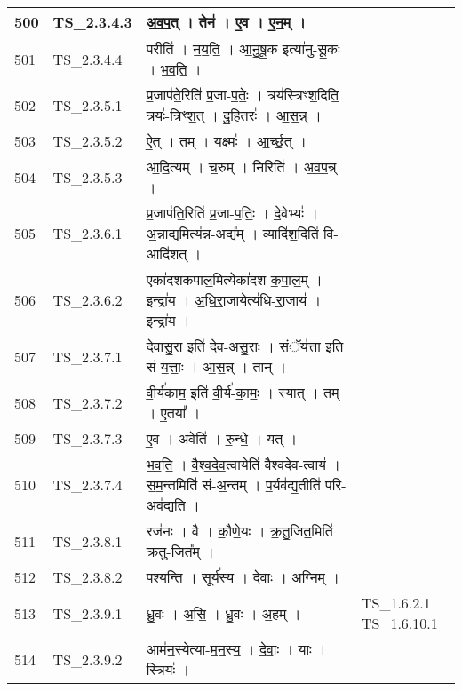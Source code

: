 \documentclass[17pt]{extarticle}
\begin{document}
\begin{longtable}{||p{0.4in}||p{0.9in}||p{4.0in}||p{0.9in}||}
        \hline
            500 & TS\_2.3.4.3 & अ॒व॒प॒त्   ।   तेन॑   ।   ए॒व   ।   ए॒न॒म्   ।    &      \\
        \hline
            501 & TS\_2.3.4.4 & परीति॑   ।   न॒य॒ति॒   ।   आ॒नु॒षू॒क इत्या॑नु{-}सू॒कः   ।   भ॒व॒ति॒   ।    &      \\
        \hline
            502 & TS\_2.3.5.1 & प्र॒जाप॑ते॒रिति॑ प्र॒जा{-}प॒तेः॒   ।   त्रय॑स्त्रिꣳश॒दिति॒ त्रयः॑{-}त्रिꣳ॒॒श॒त्   ।   दु॒हि॒तरः॑   ।   आ॒स॒न्न्   ।    &      \\
        \hline
            503 & TS\_2.3.5.2 & ऐ॒त्   ।   तम्   ।   यक्ष्मः॑   ।   आ॒र्च्छ॒त्   ।    &      \\
        \hline
            504 & TS\_2.3.5.3 & आ॒दि॒त्यम्   ।   च॒रुम्   ।   निरिति॑   ।   अ॒व॒प॒न्न्   ।    &      \\
        \hline
            505 & TS\_2.3.6.1 & प्र॒जाप॑ति॒रिति॑ प्र॒जा{-}प॒तिः॒   ।   दे॒वेभ्यः॑   ।   अ॒न्नाद्य॒मित्य॑न्न{-}अद्य᳚म्   ।   व्यादि॑श॒दिति॑ वि{-}आदि॑शत्   ।    &      \\
        \hline
            506 & TS\_2.3.6.2 & एका॑दशकपाल॒मित्येका॑दश{-}क॒पा॒ल॒म्   ।   इन्द्रा॑य   ।   अ॒धि॒रा॒जायेत्य॑धि{-}रा॒जाय॑   ।   इन्द्रा॑य   ।    &      \\
        \hline
            507 & TS\_2.3.7.1 & दे॒वा॒सु॒रा इति॑ देव{-}अ॒सु॒राः   ।   संॅय॑त्ता॒ इति॒ सं{-}य॒त्ताः॒   ।   आ॒स॒न्न्   ।   तान्   ।    &      \\
        \hline
            508 & TS\_2.3.7.2 & वी॒र्य॑काम॒ इति॑ वी॒र्य॑{-}का॒मः॒   ।   स्यात्   ।   तम्   ।   ए॒तया᳚   ।    &      \\
        \hline
            509 & TS\_2.3.7.3 & ए॒व   ।   अवेति॑   ।   रु॒न्धे॒   ।   यत्   ।    &      \\
        \hline
            510 & TS\_2.3.7.4 & भ॒व॒ति॒   ।   वै॒श्व॒दे॒व॒त्वायेति॑ वैश्वदेव{-}त्वाय॑   ।   स॒म॒न्तमिति॑ सं{-}अ॒न्तम्   ।   प॒र्यव॑द्य॒तीति॑ परि{-}अव॑द्यति   ।    &      \\
        \hline
            511 & TS\_2.3.8.1 & रज॑नः   ।   वै   ।   कौ॒णे॒यः   ।   क्र॒तु॒जित॒मिति॑ क्रतु{-}जित᳚म्   ।    &      \\
        \hline
            512 & TS\_2.3.8.2 & प॒श्य॒न्ति॒   ।   सूर्य॑स्य   ।   दे॒वाः   ।   अ॒ग्निम्   ।    &      \\
        \hline
            513 & TS\_2.3.9.1 & ध्रु॒वः   ।   अ॒सि॒   ।   ध्रु॒वः   ।   अ॒हम्   ।    & TS\_1.6.2.1 TS\_1.6.10.1        \\
        \hline
            514 & TS\_2.3.9.2 & आम॑न॒स्येत्या{-}म॒न॒स्य॒   ।   दे॒वाः॒   ।   याः   ।   स्त्रियः॑   ।    &      \\

\end{longtable}
\end{document}
